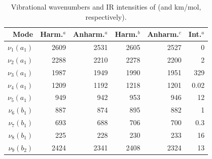 \begin{table}[ht]
   \caption{Vibrational wavenumbers and IR intensities of \linD (\wnn and
km/mol, respectively). }
    \begin{center}
    \begin{tabular}{rrrrrr} \hline
    
        Mode & Harm.$^a$ & Anharm.$^a$ & Harm.$^b$ & Anharm.$^c$ & Int.$^a$ \\ \hline
        $\nu_{1}(a_1)$ & 2609 & 2531 & 2605 & 2527 &  0   \\ %
        $\nu_{2}(a_1)$ & 2288 & 2210 & 2278 & 2200 &  2   \\ %
        $\nu_{3}(a_1)$ & 1987 & 1949 & 1990 & 1951 & 329  \\ %
        $\nu_{4}(a_1)$ & 1209 & 1192 & 1218 & 1201 & 0.02  \\ %
        $\nu_{5}(a_1)$ &  949 &  942 &  953 &  946 & 12   \\ %
        $\nu_{6}(b_1)$ &  887 &  874 &  895 &  882 &  1   \\ %
        $\nu_{7}(b_1)$ &  693 &  688 &  706 &  700 &  0.3 \\ %
        $\nu_{8}(b_1)$ &  225 &  228 &  230 &  233 &  16  \\ %
        $\nu_{9}(b_2)$ & 2424 & 2341 & 2408 & 2324 &  13  \\ %

\end{tabular}
\end{center}
\end{table}
